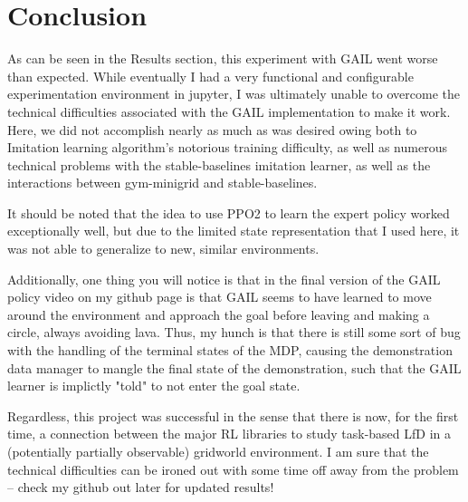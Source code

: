 \section{Conclusion}

As can be seen in the Results section, this experiment with GAIL went worse than expected. While eventually I had a very functional and configurable experimentation environment in jupyter, I was ultimately unable to overcome the technical difficulties associated with the GAIL implementation to make it work. Here, we did not accomplish nearly as much as was desired owing both to Imitation learning algorithm's notorious training difficulty, as well as numerous technical problems with the stable-baselines imitation learner, as well as the interactions between gym-minigrid and stable-baselines.

It should be noted that the idea to use PPO2 to learn the expert policy worked exceptionally well, but due to the limited state representation that I used here, it was not able to generalize to new, similar environments.

Additionally, one thing you will notice is that in the final version of the GAIL policy video on my github page is that GAIL seems to have learned to move around the environment and approach the goal before leaving and making a circle, always avoiding lava. Thus, my hunch is that there is still some sort of bug with the handling of the terminal states of the MDP, causing the demonstration data manager to mangle the final state of the demonstration, such that the GAIL learner is implictly "told" to not enter the goal state.

Regardless, this project was successful in the sense that there is now, for the first time, a connection between the major RL libraries to study task-based LfD in a (potentially partially observable) gridworld environment. I am sure that the technical difficulties can be ironed out with some time off away from the problem -- check my github out later for updated results!
